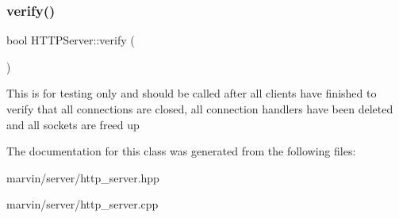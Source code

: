 \subsubsection{\texorpdfstring{verify()}{verify()}}
{\footnotesize\ttfamily bool H\+T\+T\+P\+Server\+::verify (\begin{DoxyParamCaption}{ }\end{DoxyParamCaption})\hspace{0.3cm}{\ttfamily [static]}}

This is for testing only and should be called after all clients have finished to verify that all connections are closed, all connection handlers have been deleted and all sockets are freed up 

The documentation for this class was generated from the following files\+:\begin{DoxyCompactItemize}
\item 
marvin/server/http\+\_\+server.\+hpp\item 
marvin/server/http\+\_\+server.\+cpp\end{DoxyCompactItemize}
